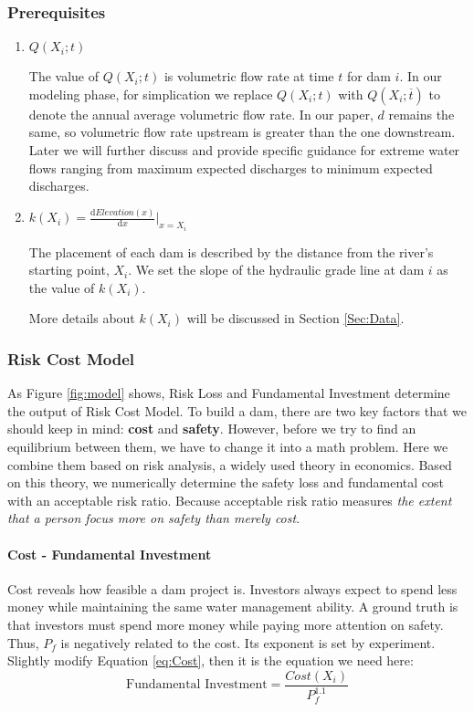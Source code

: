 \documentclass{mcmthesis}
\begin{document}
\subsubsection{Prerequisites}
\begin{enumerate}
	\item$Q(X_i;t)$

The value of $Q(X_i;t)$ is volumetric flow rate at time $t$ for dam $i$. In our modeling phase, for simplication we replace $Q(X_i;t)$ with $Q(X_i;\overline{t})$ to denote the annual average volumetric flow rate. In our paper, $d$ remains the same, so volumetric flow rate upstream is greater than the one downstream.\\
Later we will further discuss and provide specific guidance for extreme water flows ranging from maximum expected discharges to minimum expected discharges.
	\item$k(X_i) = \frac{\mathrm{d}	Elevation(x)}{\mathrm{d}x}|_{x=X_i}$

The placement of each dam is described by the distance from the river's starting point, $X_i$. We set the slope of the hydraulic grade line at dam $i$ as the value of $k(X_i)$.

More details about $k(X_i)$ will be discussed in Section \ref{Sec:Data}.
\end{enumerate}

\subsubsection{Risk Cost Model}
As Figure \ref{fig:model} shows, Risk Loss and Fundamental Investment determine the output of Risk Cost Model. To build a dam, there are two key factors that we should keep in mind: \textbf{cost} and \textbf{safety}. However, before we try to find an equilibrium between them, we have to change it into a math problem. Here we combine them based on risk analysis, a widely used theory in economics. Based on this theory, we numerically determine the safety loss and fundamental cost with an acceptable risk ratio. Because acceptable risk ratio measures \emph{the extent that a person focus more on safety than merely cost}.
\paragraph{Cost - Fundamental Investment} Cost reveals how feasible a dam project is. Investors always expect to spend less money while maintaining the same water management ability. A ground truth is that investors must spend more money while paying more attention on safety. Thus, $P_f$ is negatively related to the cost. Its exponent is set by experiment. Slightly modify Equation \eqref{eq:Cost}, then it is the equation we need here:
\begin{equation}
\label{eq:Fund}
\text{Fundamental Investment} = \frac{Cost(X_i)}{P_f^{1.1}}
\end{equation}
\end{document}

